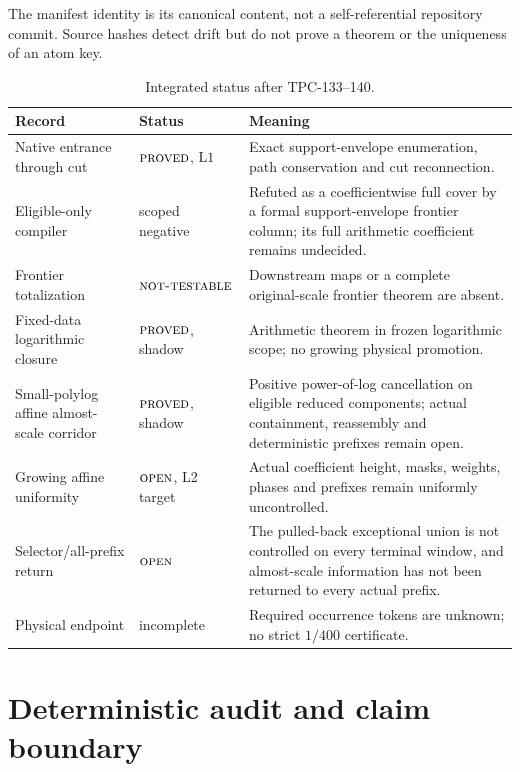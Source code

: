 \documentclass[11pt]{article}
\theoremstyle{definition}
\theoremstyle{remark}
\newcommand{\Lone}{\mathrm{L1}}
\newcommand{\NT}{\textnormal{\textsc{not-testable}}}
\newcommand{\PROVED}{\textnormal{\textsc{proved}}}
\newcommand{\OPEN}{\textnormal{\textsc{open}}}
\begin{document}
The manifest identity is its canonical content, not a self-referential
repository commit.  Source hashes detect drift but do not prove a
theorem or the uniqueness of an atom key.

\begin{table}[htbp]
\centering
\small
\caption{Integrated status after TPC-133--140.}
\begin{tabularx}{\textwidth}{@{}P{0.27\textwidth}P{0.18\textwidth}Y@{}}
\toprule
Record & Status & Meaning\\
\midrule
Native entrance through cut & \(\PROVED\), \(\Lone\) &
Exact support-envelope enumeration, path conservation and cut
reconnection.\\
Eligible-only compiler & scoped negative &
Refuted as a coefficientwise full cover by a formal support-envelope
frontier column; its full arithmetic coefficient remains undecided.\\
Frontier totalization & \(\NT\) &
Downstream maps or a complete original-scale frontier theorem are
absent.\\
Fixed-data logarithmic closure & \(\PROVED\), shadow &
Arithmetic theorem in frozen logarithmic scope; no growing physical
promotion.\\
Small-polylog affine almost-scale corridor & \(\PROVED\), shadow &
Positive power-of-log cancellation on eligible reduced components;
actual containment, reassembly and deterministic prefixes remain
open.\\
Growing affine uniformity & \(\OPEN\), L2 target &
Actual coefficient height, masks, weights, phases and prefixes remain
uniformly uncontrolled.\\
Selector/all-prefix return & \(\OPEN\) &
The pulled-back exceptional union is not controlled on every terminal
window, and almost-scale information has not been returned to every
actual prefix.\\
Physical endpoint & incomplete &
Required occurrence tokens are unknown; no strict \(1/400\)
certificate.\\
\bottomrule
\end{tabularx}
\end{table}

\section{Deterministic audit and claim boundary}
\end{document}
